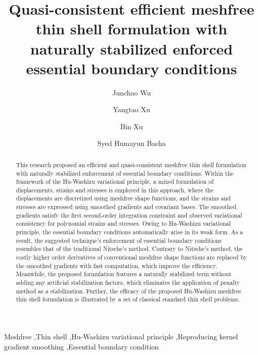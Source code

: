 
\begin{frontmatter}
    \title{Quasi-consistent efficient meshfree thin shell formulation with naturally stabilized enforced essential boundary conditions}
    \author[1]{Junchao Wu}
    \author[1]{Yangtao Xu}
    \author[1]{Bin Xu}
    \author[1]{Syed Humayun Basha}



\begin{abstract}
This research proposed an efficient and quasi-consistent meshfree thin shell formulation with naturally stabilized enforcement of essential boundary conditions. Within the framework of the Hu-Washizu variational principle, a mixed formulation of displacements, strains and stresses is employed in this approach, where the displacements are discretized using meshfree shape functions, and the strains and stresses are expressed using smoothed gradients and covariant bases. The smoothed gradients satisfy the first second-order integration constraint and observed variational consistency for polynomial strains and stresses. Owing to Hu-Washizu variational principle, the essential boundary conditions automatically arise in its weak form. As a result, the suggested technique's enforcement of essential boundary conditions resembles that of the traditional Nitsche's method. Contrary to Nitsche's method, the costly higher order derivatives of conventional meshfree shape functions are replaced by the smoothed gradients with fast computation, which improve the efficiency. Meanwhile, the proposed formulation features a naturally stabilized term without adding any artificial stabilization factors, which eliminates the application of penalty method as a stabilization. Further, the efficacy of the proposed Hu-Washizu meshfree thin shell formulation is illustrated by a set of classical standard thin shell problems.
\end{abstract}
\begin{keyword}
Meshfree \sep Thin shell \sep Hu-Washizu variational principle \sep Reproducing kernel gradient smoothing \sep Essential boundary condition
\end{keyword}
\end{frontmatter}
